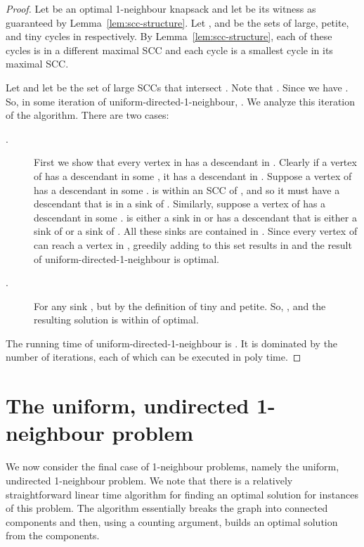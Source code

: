 \documentclass[12pt]{article}
\begin{document}
\begin{proof}
Let  be an optimal 1-neighbour knapsack and let  be
its witness as guaranteed by Lemma~\ref{lem:scc-structure}.
Let , and  be the sets of large, petite, and tiny cycles in
 respectively.   
By Lemma~\ref{lem:scc-structure}, each of these cycles is in a
different maximal SCC and each cycle is a smallest cycle in its
maximal SCC.

Let  and let  be the set of large SCCs that intersect .  Note that .  Since  we have .
So, in some iteration of {\sc uniform-directed-1-neighbour}, .  We analyze this iteration of the algorithm.  There are two
cases:
\begin{description}
\item[.] First we show that every vertex in  has a descendant in .  Clearly if a vertex of  has a descendant in some , it has
a descendant in .  Suppose a vertex of  has a descendant in
some .   is within an SCC of , and so it must have a
descendant that is in a sink of .  Similarly, suppose a vertex of 
has a descendant in some .   is either a sink in  or has a
descendant that is either a sink of  or a sink of .
All these sinks are contained in . Since every vertex of  can reach a
vertex in , greedily adding to
this set results in  and the result of {\sc
uniform-directed-1-neighbour} is optimal.

\item[.]For any sink ,  but  by the definition of tiny and petite.  So, , and the resulting solution is within
 of optimal.
\end{description}

The running time of {\sc uniform-directed-1-neighbour} is
.  It is dominated by the number of iterations,
each of which can be executed in poly time. \hfill  \end{proof}


\section{The uniform, undirected 1-neighbour  problem} \label{sec:uu1n}

We now consider the final case of 1-neighbour problems, namely the
uniform, undirected 1-neighbour problem.
We note that there is a relatively straightforward
linear time algorithm for finding an optimal solution for instances of this problem.  The algorithm essentially breaks the graph into connected components and then, using a counting argument, builds an optimal solution from the components.
\end{document}
